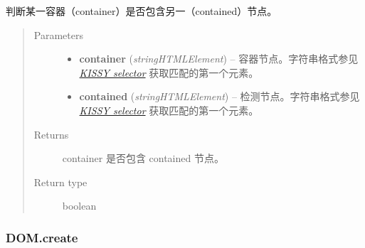 \documentclass[letterpaper,10pt,english]{sphinxmanual}
\begin{document}
\begin{fulllineitems}
\label{api/core/dom/contains:DOM.contains}
判断某一容器（container）是否包含另一（contained）节点。
\begin{quote}\begin{description}
\item[{Parameters}] \leavevmode\begin{itemize}
\item {}
\textbf{container} (\emph{string\textbar{}HTMLElement}) -- 容器节点。字符串格式参见 {\hyperref[api/core/dom/selector:dom-selector]{\emph{KISSY selector}}} 获取匹配的第一个元素。

\item {}
\textbf{contained} (\emph{string\textbar{}HTMLElement}) -- 检测节点。字符串格式参见 {\hyperref[api/core/dom/selector:dom-selector]{\emph{KISSY selector}}} 获取匹配的第一个元素。

\end{itemize}

\item[{Returns}] \leavevmode
container 是否包含 contained 节点。

\item[{Return type}] \leavevmode
boolean

\end{description}\end{quote}

\end{fulllineitems}



\subsubsection{DOM.create}
\label{api/core/dom/create:dom-create}\label{api/core/dom/create::doc}
\end{document}
